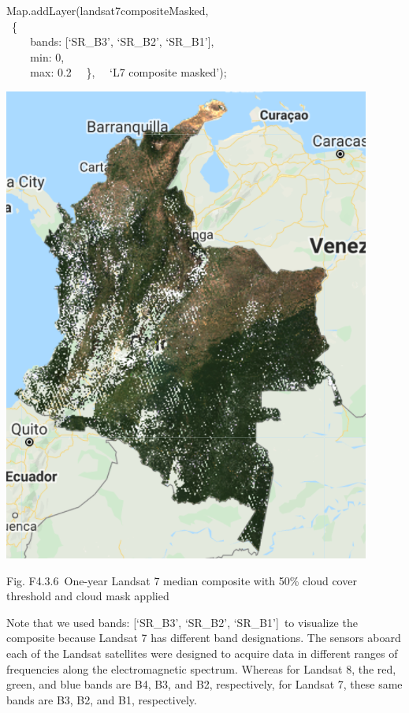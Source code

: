 \documentclass[
  letterpaper,
  DIV=11,
  numbers=noendperiod]{scrreprt}
\begin{document}
Map.addLayer(landsat7compositeMasked,\\
\hspace*{0.333em} ~\{\\
\hspace*{0.333em} ~ ~ ~bands: {[}`SR\_B3', `SR\_B2', `SR\_B1'{]},\\
\hspace*{0.333em} ~ ~ ~min: 0,\\
\hspace*{0.333em} ~ ~ ~max: 0.2~ ~\},~ ~`L7 composite masked');

\includegraphics{./F4/image73.png}

Fig. F4.3.6~One-year Landsat 7 median composite with 50\% cloud cover
threshold and cloud mask applied

Note that we used bands: {[}`SR\_B3', `SR\_B2', `SR\_B1'{]}~to visualize
the composite because Landsat 7 has different band designations. The
sensors aboard each of the Landsat satellites were designed to acquire
data in different ranges of frequencies along the electromagnetic
spectrum. Whereas for Landsat 8, the red, green, and blue bands are B4,
B3, and B2, respectively, for Landsat 7, these same bands are B3, B2,
and B1, respectively.
\end{document}
